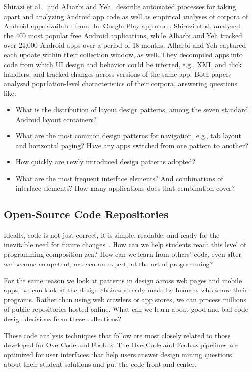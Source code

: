 Shirazi et al.~\cite{Shirazi} and Alharbi and Yeh~\cite{Alharbi} describe automated processes for taking apart and analyzing Android app code as well as empirical analyses of corpora of Android apps available from the Google Play app store. Shirazi et al. analyzed the 400 most popular free Android applications, while Alharbi and Yeh tracked over 24,000 Android apps over a period of 18 months. Alharbi and Yeh captured each update within their collection window, as well. They decompiled apps into code from which UI design and behavior could be inferred, e.g., XML and click handlers, and tracked changes across versions of the same app. Both papers analysed population-level characteristics of their corpora, answering questions like:
\begin{itemize}
\item     What is the distribution of layout design patterns, among the seven standard Android layout containers?
\item     What are the most common design patterns for navigation, e.g., tab layout and horizontal paging? Have any apps switched from one pattern to another?
\item     How quickly are newly introduced design patterns adopted?
\item     What are the most frequent interface elements? And combinations of interface elements? How many applications does that combination cover?
\end{itemize}

\subsection{Open-Source Code Repositories}

Ideally, code is not just correct, it is simple, readable, and ready for the inevitable need for future changes~\cite{peters2010zen,6005notes}. How can we help students reach this level of programming composition zen? How can we learn from others' code, even after we become competent, or even an expert, at the art of programming?

For the same reason we look at patterns in design across web pages and mobile apps, we can look at the design choices already made by humans who share their programs. Rather than using web crawlers or app stores, we can process millions of public repositories hosted online. What can we learn about good and bad code design decisions from these collections?

These code analysis techniques that follow are most closely related to those developed for OverCode and Foobaz. The OverCode and Foobaz pipelines are optimized for user interfaces that help users answer design mining questions about their student solutions and put the code front and center. 

